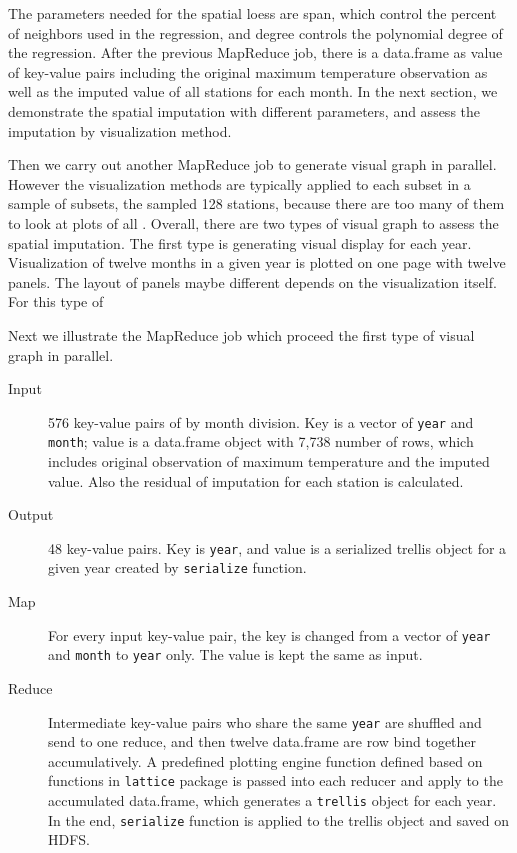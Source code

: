 The parameters needed for the spatial loess are span, which control the percent
of neighbors used in the regression, and degree controls the polynomial degree of
the regression. 
After the previous MapReduce job, there is a data.frame as value of key-value 
pairs including the original maximum temperature observation as well as the 
imputed value of all stations for each month. In the next section, we demonstrate
the spatial imputation with different parameters, and assess the imputation by
visualization method.

Then we carry out another MapReduce job to generate visual graph in parallel. 
However the visualization methods are typically applied to each subset in a 
sample of subsets, the sampled 128 stations, because there are too many of them 
to look at plots of all \cite{Hafen:2013}.
Overall, there are two types of visual graph to assess the spatial imputation. The
first type is generating visual display for each year. Visualization of twelve
months in a given year is plotted on one page with twelve panels. The layout of
panels maybe different depends on the visualization itself. For this type of 

Next we illustrate the MapReduce job which proceed the first type of visual graph
in parallel.

\begin{description}
  \item[Input] 576 key-value pairs of by month division. Key is a vector of
  \texttt{year} and \texttt{month}; value is a data.frame object with 7,738 
  number of rows, which includes original observation of maximum temperature
  and the imputed value. Also the residual of imputation for each station is 
  calculated.
  \item[Output] 48 key-value pairs. Key is \texttt{year}, and value is a serialized
  trellis object for a given year created by \texttt{serialize} function.
  \item[Map]For every input key-value pair, the key is changed from a vector of 
  \texttt{year} and \texttt{month} to \texttt{year} only. The value is kept the
  same as input.
  \item[Reduce] Intermediate key-value pairs who share the same \texttt{year} are
  shuffled and send to one reduce, and then twelve data.frame are row bind 
  together accumulatively. A predefined plotting engine function defined based on 
  functions in \texttt{lattice} package is passed into each reducer and apply to 
  the accumulated data.frame, which generates a \texttt{trellis} object for each 
  year. In the end, \texttt{serialize} function is applied to the trellis object 
  and saved on HDFS.
\end{description}

